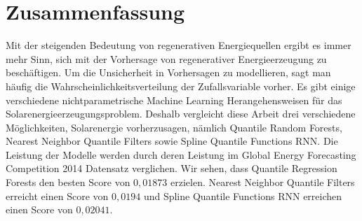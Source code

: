 
\chapter*{Zusammenfassung}

\begin{center}
  \begin{minipage}{12cm}
    \begin{sloppypar}
      Mit der steigenden Bedeutung von regenerativen Energiequellen ergibt es immer mehr Sinn, 
      sich mit der Vorhersage von regenerativer Energieerzeugung zu beschäftigen. 
      Um die Unsicherheit in Vorhersagen zu modellieren, sagt man häufig die Wahrscheinlichkeitsverteilung der 
      Zufallsvariable vorher. Es gibt einige verschiedene nichtparametrische Machine Learning Herangehensweisen 
      für das Solarenergieerzeugungsproblem. Deshalb vergleicht diese Arbeit drei verschiedene Möglichkeiten, Solarenergie 
      vorherzusagen, nämlich Quantile Random Forests, Nearest Neighbor Quantile Filters sowie Spline Quantile Functions RNN. 
      Die Leistung der Modelle werden durch deren Leistung im Global Energy Forecasting Competition 2014 Datensatz verglichen. 
      Wir sehen, dass Quantile Regression Forests den besten Score von \(0{,}01873\) erzielen. Nearest Neighbor Quantile Filters 
      erreicht einen Score von \(0{,}0194\) und Spline Quantile Functions RNN erreichen einen Score von \(0{,}02041\).
    \end{sloppypar}
  \end{minipage}
\end{center}